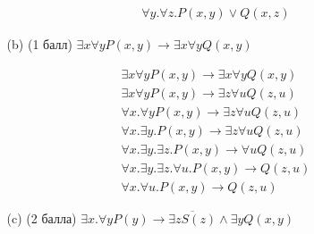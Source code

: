 \begin{enumerate}
\begin{itemize}
\begin{solution}
\begin{align*}
                &\forall y. \forall z . P(x, y) \lor Q(x, z)
            \end{align*}
        \end{solution}
        \item[(b)] (1 балл) $\exists x\forall y P(x, y) \rightarrow \exists x\forall y Q(x, y)$
        \begin{solution}
            \begin{align*}
                &\exists x\forall y P(x, y) \rightarrow \exists x\forall y Q(x, y) \\
                &\exists x\forall y P(x, y) \rightarrow \exists z\forall u Q(z, u) \\
                &\forall x . \forall y P(x, y) \rightarrow \exists z\forall u Q(z, u) \\
                &\forall x . \exists y . P(x, y) \rightarrow \exists z\forall u Q(z, u) \\
                &\forall x . \exists y . \exists z . P(x, y) \rightarrow \forall u Q(z, u) \\
                &\forall x . \exists y . \exists z . \forall u . P(x, y) \rightarrow Q(z, u) \\
                &\forall x . \forall u . P(x, y) \rightarrow Q(z, u)
            \end{align*}
        \end{solution}
        \item[(c)] (2 балла) $\exists x. \forall y P(y) \rightarrow \overline{\exists z S(z)} \land \exists y Q(x, y)$
    \end{itemize}
\end{enumerate}
\clearpage
